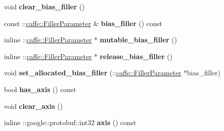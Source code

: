 \begin{DoxyCompactItemize}
\item 
\mbox{\label{classcaffe_1_1_inner_product_parameter_a93a47e493536d43ed43f6c5b4358a027}} 
void {\bfseries clear\+\_\+bias\+\_\+filler} ()
\item 
\mbox{\label{classcaffe_1_1_inner_product_parameter_aeb5dd4fb80b004325a6d742829b206d0}} 
const \+::\mbox{\hyperlink{classcaffe_1_1_filler_parameter}{caffe\+::\+Filler\+Parameter}} \& {\bfseries bias\+\_\+filler} () const
\item 
\mbox{\label{classcaffe_1_1_inner_product_parameter_a10b33d5afd4c5881b6de3c4b86c74bcd}} 
inline \+::\mbox{\hyperlink{classcaffe_1_1_filler_parameter}{caffe\+::\+Filler\+Parameter}} $\ast$ {\bfseries mutable\+\_\+bias\+\_\+filler} ()
\item 
\mbox{\label{classcaffe_1_1_inner_product_parameter_a0f795810dfb76c037873c91af745c0bc}} 
inline \+::\mbox{\hyperlink{classcaffe_1_1_filler_parameter}{caffe\+::\+Filler\+Parameter}} $\ast$ {\bfseries release\+\_\+bias\+\_\+filler} ()
\item 
\mbox{\label{classcaffe_1_1_inner_product_parameter_a1f90cac00fd9d0c02b6c782e7bd484ff}} 
void {\bfseries set\+\_\+allocated\+\_\+bias\+\_\+filler} (\+::\mbox{\hyperlink{classcaffe_1_1_filler_parameter}{caffe\+::\+Filler\+Parameter}} $\ast$bias\+\_\+filler)
\item 
\mbox{\label{classcaffe_1_1_inner_product_parameter_a085e2486fd4c26bac9c2da1adba95e50}} 
bool {\bfseries has\+\_\+axis} () const
\item 
\mbox{\label{classcaffe_1_1_inner_product_parameter_a4480734a963215e3fbe89029b4076176}} 
void {\bfseries clear\+\_\+axis} ()
\item 
\mbox{\label{classcaffe_1_1_inner_product_parameter_a6f5b70acd51301995d6b60c091fa85b7}} 
inline \+::google\+::protobuf\+::int32 {\bfseries axis} () const
\item 

\end{DoxyCompactItemize}
